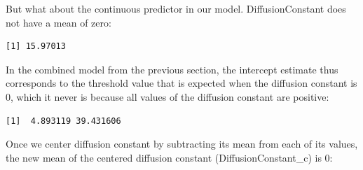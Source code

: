 \documentclass[
]{article}
\newenvironment{Shaded}{\begin{snugshade}}{\end{snugshade}}
\newcommand{\ControlFlowTok}[1]{\textcolor[rgb]{0.13,0.29,0.53}{\textbf{#1}}}
\newcommand{\DecValTok}[1]{\textcolor[rgb]{0.00,0.00,0.81}{#1}}
\newcommand{\KeywordTok}[1]{\textcolor[rgb]{0.13,0.29,0.53}{\textbf{#1}}}
\newcommand{\NormalTok}[1]{#1}
\newcommand{\OperatorTok}[1]{\textcolor[rgb]{0.81,0.36,0.00}{\textbf{#1}}}
\newcommand{\StringTok}[1]{\textcolor[rgb]{0.31,0.60,0.02}{#1}}
\begin{document}
But what about the continuous predictor in our model. DiffusionConstant
does not have a mean of zero:

\footnotesize

\begin{Shaded}
\end{Shaded}

\begin{verbatim}
[1] 15.97013
\end{verbatim}

\normalsize

In the combined model from the previous section, the intercept estimate
thus corresponds to the threshold value that is expected when the
diffusion constant is 0, which it never is because all values of the
diffusion constant are positive:

\footnotesize

\begin{Shaded}
\end{Shaded}

\begin{verbatim}
[1]  4.893119 39.431606
\end{verbatim}

\normalsize

Once we center diffusion constant by subtracting its mean from each of
its values, the new mean of the centered diffusion constant
(DiffusionConstant\_c) is 0:

\footnotesize

\begin{Shaded}
\end{Shaded}
\end{document}
